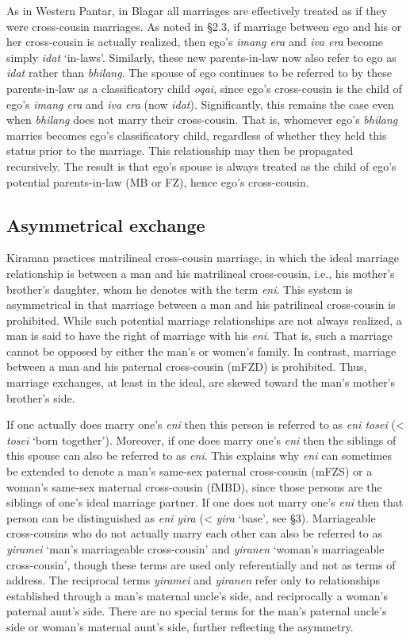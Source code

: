 As in Western Pantar, in Blagar all marriages are effectively treated as if they were cross-cousin marriages. As noted in {\S}2.3, if marriage between ego and his or her cross-cousin is actually realized, then ego's \textit{imang era} and \textit{iva era} become simply \textit{idat} `in-laws'. Similarly, these new parents-in-law now also refer to ego as \textit{idat} rather than \textit{bhilang}. The spouse of ego continues to be referred to by these parents-in-law as a classificatory child \textit{oqai}, since ego's cross-cousin is the child of ego's \textit{imang era} and \textit{iva era} (now \textit{idat}). Significantly, this remains the case even when \textit{bhilang} does not marry their cross-cousin. That is, whomever ego's \textit{bhilang} marries becomes ego's classificatory child, regardless of whether they held this status prior to the marriage. This relationship may then be propagated recursively. The result is that ego's spouse is always treated as the child of ego's potential parents-in-law (MB or FZ), hence ego's cross-cousin.

\subsection{Asymmetrical exchange}
\label{bkm:Ref247334472}Kiraman practices matrilineal cross-cousin marriage, in which the ideal marriage relationship is between a man and his matrilineal cross-cousin, i.e., his mother's brother's daughter, whom he denotes with the term \textit{eni}. This system is asymmetrical in that marriage between a man and his patrilineal cross-cousin is prohibited. While such potential marriage relationships are not always realized, a man is said to have the right of marriage with his \textit{eni}. That is, such a marriage cannot be opposed by either the man's or women's family. In contrast, marriage between a man and his paternal cross-cousin (mFZD) is prohibited. Thus, marriage exchanges, at least in the ideal, are skewed toward the man's mother's brother's side.

If one actually does marry one's \textit{eni} then this person is referred to as \textit{eni tosei} ({\textless} \textit{tosei} `born together'). Moreover, if one does marry one's \textit{eni} then the siblings of this spouse can also be referred to as \textit{eni}. This explains why \textit{eni} can sometimes be extended to denote a man's same-sex paternal cross-cousin (mFZS) or a woman's same-sex maternal cross-cousin (fMBD), since those persons are the siblings of one's ideal marriage partner. If one does not marry one's \textit{eni} then that person can be distinguished as \textit{eni yira} ({\textless} \textit{yira} `base', see {\S}3). Marriageable cross-cousins who do not actually marry each other can also be referred to as \textit{yiramei} `man's marriageable cross-cousin' and \textit{yiranen} `woman's marriageable cross-cousin', though these terms are used only referentially and not as terms of address. The reciprocal terms \textit{yiramei} and \textit{yiranen} refer only to relationships established through a man's maternal uncle's side, and reciprocally a woman's paternal aunt's side. There are no special terms for the man's paternal uncle's side or woman's maternal aunt's side, further reflecting the asymmetry.

